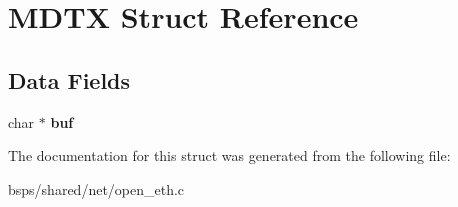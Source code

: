 \hypertarget{structMDTX}{}\section{M\+D\+TX Struct Reference}
\label{structMDTX}
\subsection*{Data Fields}
\begin{DoxyCompactItemize}
\item 
\mbox{\label{structMDTX_a55801a7c975bd690c2edcb0b22fe9797}} 
char $\ast$ {\bfseries buf}
\end{DoxyCompactItemize}


The documentation for this struct was generated from the following file\+:\begin{DoxyCompactItemize}
\item 
bsps/shared/net/open\+\_\+eth.\+c\end{DoxyCompactItemize}
